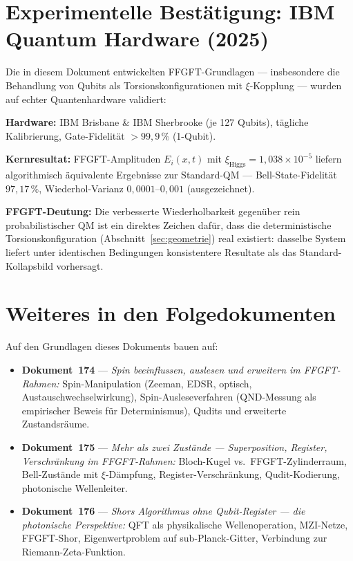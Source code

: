 \section{Experimentelle Bestätigung: IBM Quantum Hardware (2025)}
\label{sec:ibm-validation}

\begin{keyresult}
Die in diesem Dokument entwickelten FFGFT-Grundlagen ---
insbesondere die Behandlung von Qubits als Torsionskonfigurationen
mit $\xi$-Kopplung --- wurden auf echter Quantenhardware validiert:

\textbf{Hardware:} IBM Brisbane \& IBM Sherbrooke (je 127 Qubits),
tägliche Kalibrierung, Gate-Fidelität $> 99{,}9\,\%$ (1-Qubit).

\textbf{Kernresultat:}
FFGFT-Amplituden $E_i(x,t)$ mit $\xi_\text{Higgs} = 1{,}038 \times 10^{-5}$
liefern algorithmisch äquivalente Ergebnisse zur Standard-QM ---
Bell-State-Fidelität $97{,}17\,\%$, Wiederhol-Varianz
$0{,}0001$--$0{,}001$ (ausgezeichnet).

\textbf{FFGFT-Deutung:}
Die verbesserte Wiederholbarkeit gegenüber rein probabilistischer QM
ist ein direktes Zeichen dafür, dass die deterministische
Torsionskonfiguration (Abschnitt~\ref{sec:geometrie}) real existiert:
dasselbe System liefert unter identischen Bedingungen
konsistentere Resultate als das Standard-Kollapsbild vorhersagt.
\end{keyresult}

\section{Weiteres in den Folgedokumenten}
\label{sec:folgedokumente}

Auf den Grundlagen dieses Dokuments bauen auf:

\begin{itemize}
  \item \textbf{Dokument~174} --- \textit{Spin beeinflussen, auslesen und erweitern
    im FFGFT-Rahmen:}
    Spin-Manipulation (Zeeman, EDSR, optisch, Austauschwechselwirkung),
    Spin-Ausleseverfahren (QND-Messung als empirischer Beweis für Determinismus),
    Qudits und erweiterte Zustandsräume.

  \item \textbf{Dokument~175} --- \textit{Mehr als zwei Zustände --- Superposition,
    Register, Verschränkung im FFGFT-Rahmen:}
    Bloch-Kugel vs.\ FFGFT-Zylinderraum, Bell-Zustände mit $\xi$-Dämpfung,
    Register-Verschränkung, Qudit-Kodierung, photonische Wellenleiter.

  \item \textbf{Dokument~176} --- \textit{Shors Algorithmus ohne Qubit-Register
    --- die photonische Perspektive:}
    QFT als physikalische Wellenoperation, MZI-Netze, FFGFT-Shor,
    Eigenwertproblem auf sub-Planck-Gitter, Verbindung zur Riemann-Zeta-Funktion.
\end{itemize}
